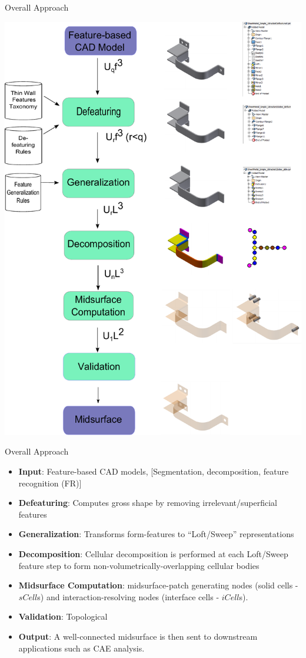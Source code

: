 

\begin{frame}[<+-| alert@+>]{Overall Approach}

	\includegraphics[width=0.5\linewidth]{../Common/images/SystemArchitecture3.pdf}

\end{frame}



\begin{frame}[<+-| alert@+>]{Overall Approach}

\begin{itemize}[noitemsep,topsep=2pt,parsep=2pt,partopsep=2pt,leftmargin=*]
\item \textbf{Input}: Feature-based CAD models, [Segmentation, decomposition, feature recognition (FR)]

\item \textbf{Defeaturing}:  Computes gross shape by removing irrelevant/superficial features

\item \textbf{Generalization}: Transforms form-features to ``Loft/Sweep'' representations 

\item \textbf{Decomposition}: Cellular decomposition is performed at each Loft/Sweep feature step to form non-volumetrically-overlapping cellular bodies 

\item \textbf{Midsurface Computation}: midsurface-patch generating nodes (solid cells - $sCell$s) and interaction-resolving nodes (interface cells - $iCell$s). 

\item \textbf{Validation}: Topological

\item \textbf{Output}: A well-connected midsurface is then sent to downstream applications such as CAE analysis.
\end{itemize}
\end{frame}


